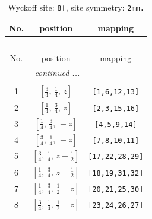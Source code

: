 \documentclass[fleqn,8pt]{jsarticle}
\begin{document}
\begin{longtable}{ccc}
\caption{Wyckoff site: {\tt 8f}, site symmetry: {\tt 2mm.}}
 \\
 \hline \hline
No. & position & mapping \\ \hline \endfirsthead

\multicolumn{2}{l}{\tablename\ \thetable{}} \\
 \hline \hline
No. & position & mapping \\ \hline \endhead

 \hline \hline
\multicolumn{2}{r}{\footnotesize\it continued ...} \\ \endfoot

 \hline \hline
\multicolumn{2}{r}{} \\ \endlastfoot

1 & $\left[ \frac{3}{4},\, \frac{1}{4},\, z \right]$ & {\tt [1,6,12,13]} \\ \hline
2 & $\left[ \frac{1}{4},\, \frac{3}{4},\, z \right]$ & {\tt [2,3,15,16]} \\ \hline
3 & $\left[ \frac{1}{4},\, \frac{3}{4},\, - z \right]$ & {\tt [4,5,9,14]} \\ \hline
4 & $\left[ \frac{3}{4},\, \frac{1}{4},\, - z \right]$ & {\tt [7,8,10,11]} \\ \hline
5 & $\left[ \frac{3}{4},\, \frac{1}{4},\, z + \frac{1}{2} \right]$ & {\tt [17,22,28,29]} \\ \hline
6 & $\left[ \frac{1}{4},\, \frac{3}{4},\, z + \frac{1}{2} \right]$ & {\tt [18,19,31,32]} \\ \hline
7 & $\left[ \frac{1}{4},\, \frac{3}{4},\, \frac{1}{2} - z \right]$ & {\tt [20,21,25,30]} \\ \hline
8 & $\left[ \frac{3}{4},\, \frac{1}{4},\, \frac{1}{2} - z \right]$ & {\tt [23,24,26,27]} \\
\end{longtable}
\renewcommand{\arraystretch}{1.2}
\end{document}
